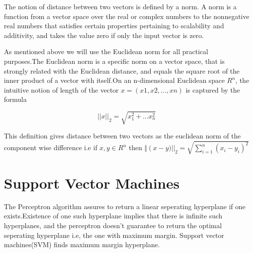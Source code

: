 \documentclass[12pt]{article}
\begin{document}
 The notion of distance between two vectors is defined by a norm. A norm is a function from a vector space over the real or complex numbers to the nonnegative real numbers that satisfies certain properties pertaining to scalability and additivity, and takes the value zero if only the input vector is zero.
 
 As mentioned above we will use the Euclidean norm for all practical purposes.The Euclidean norm  is a specific norm on a vector space, that is strongly related with the Euclidean distance, and equals the square root of the inner product of a vector with itself.On an n-dimensional Euclidean space $ R^{n}$, the intuitive notion of length of the vector $x = (x1, x2, ..., xn)$ is captured by the formula
 
 $$\vert \vert x \vert \vert _{2} = \sqrt{x_{1}^{2}+ \dots x_{n}^{2}}$$
 
 
This definition gives distance between two vectors as the euclidean norm of the component wise difference i.e if $x,y \in R^{n}$ then $ \Vert\left(x-y)\vert\right\vert_{2} = \sqrt{\sum\limits_{i=1}^{n}(x_{i}-y_{i})^{2}} $
 
 
 
 
 
 
 
 \section{Support Vector Machines}
 
 The Perceptron algorithm assures to return a linear seperating hyperplane if one exists.Existence of one  such  hyperplane implies that there is infinite such hyperplanes, and the perceptron doesn't guarantee to return the optimal seperating hyperplane i.e, the one with maximum margin.
 Support vector machines(SVM) finds maximum margin hyperplane. 
 
 
 
  
 
 
 
 
 
 
\end{document}
